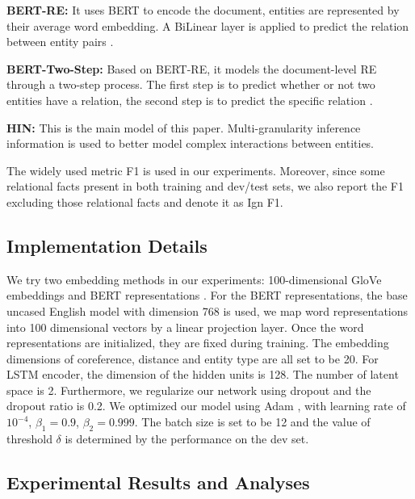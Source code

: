 \documentclass[runningheads]{llncs}
\begin{document}
\textbf{BERT-RE:}
It uses BERT to encode the document, entities are represented by their average word embedding.
A BiLinear layer is applied to predict the relation between entity pairs \cite{wang2019fine}.

\textbf{BERT-Two-Step:}
Based on BERT-RE, it models the document-level RE through a two-step process. The first step is to predict whether or not two entities have a relation, the second step is to predict the specific relation \cite{wang2019fine}.

\textbf{HIN:}
This is the main model of this paper. Multi-granularity inference information is used to better model complex interactions between entities.

The widely used metric F1 is used in our experiments. Moreover, since some relational facts present in both training and dev/test sets, we also report the F1 excluding those relational facts and denote it as Ign F1.

\subsection{Implementation Details}
We try two embedding methods in our experiments: 100-dimensional GloVe \cite{pennington2014glove} embeddings and BERT representations \cite{devlin2018bert}.
For the BERT representations, the base uncased English model with dimension 768 is used, we map word representations into 100 dimensional vectors by a linear projection layer.
Once the word representations are initialized, they are fixed during training.
The embedding dimensions of coreference, distance and entity type are all set to be 20.
For LSTM encoder, the dimension of the hidden units is 128.
The number of latent space is 2.
Furthermore, we regularize our network using dropout and the dropout ratio is 0.2.
We optimized our model using Adam \cite{kingma2014adam}, with learning rate of $10^{-4}$, $\beta_{1}=0.9$, $\beta_{2}=0.999$.
The batch size is set to be 12 and the value of threshold $\delta$ is determined by the performance on the dev set.

\subsection{Experimental Results and Analyses}
\end{document}
